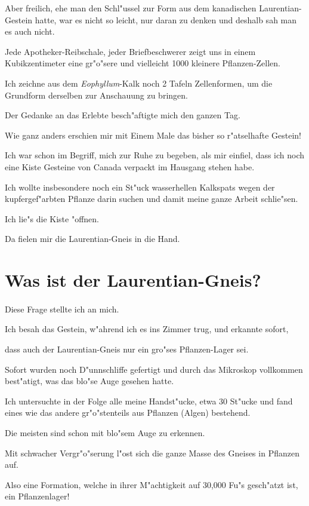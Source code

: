 \documentclass[a4paper, 11pt, oneside, german]{article}
\begin{document}
Aber freilich, ehe man den Schl"ussel zur Form aus dem kanadischen Laurentian-Gestein hatte, war es nicht so leicht, nur daran zu denken und deshalb sah man es auch nicht.

Jede Apotheker-Reibschale, jeder Briefbeschwerer zeigt uns in einem Kubikzentimeter eine gr"o"sere und vielleicht 1000 kleinere Pflanzen-Zellen.

Ich zeichne aus dem \emph{Eophyllum}-Kalk noch 2 Tafeln Zellenformen, um die Grundform derselben zur Anschauung zu bringen.

Der Gedanke an das Erlebte besch"aftigte mich den ganzen Tag.

Wie ganz anders erschien mir mit Einem Male das bisher so r"atselhafte Gestein!

Ich war schon im Begriff, mich zur Ruhe zu begeben, als mir einfiel, dass ich noch eine Kiste Gesteine von Canada verpackt im Hausgang stehen habe.

Ich wollte insbesondere noch ein St"uck wasserhellen Kalkspats wegen der kupfergef"arbten Pflanze darin suchen und damit meine ganze Arbeit schlie"sen.

Ich lie"s die Kiste "offnen.

Da fielen mir die Laurentian-Gneis in die Hand.
\clearpage
\section{Was ist der Laurentian-Gneis?}
\paragraph{}
Diese Frage stellte ich an mich.

Ich besah das Gestein, w"ahrend ich es ins Zimmer trug, und erkannte sofort,

dass auch der Laurentian-Gneis nur ein gro"ses Pflanzen-Lager sei.

Sofort wurden noch D"unnschliffe gefertigt und durch das Mikroskop vollkommen best"atigt, was das blo"se Auge gesehen hatte.

Ich untersuchte in der Folge alle meine Handst"ucke, etwa 30 St"ucke und fand eines wie das andere gr"o"stenteils aus Pflanzen (Algen) bestehend.

Die meisten sind schon mit blo"sem Auge zu erkennen.

Mit schwacher Vergr"o"serung l"ost sich die ganze Masse des Gneises in Pflanzen auf.

Also eine Formation, welche in ihrer M"achtigkeit auf 30,000 Fu"s gesch"atzt ist, ein Pflanzenlager!
\end{document}
